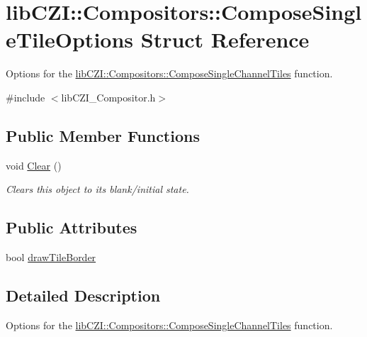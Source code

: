 \hypertarget{structlib_c_z_i_1_1_compositors_1_1_compose_single_tile_options}{}\section{lib\+C\+ZI\+:\+:Compositors\+:\+:Compose\+Single\+Tile\+Options Struct Reference}
\label{structlib_c_z_i_1_1_compositors_1_1_compose_single_tile_options}


Options for the \hyperlink{classlib_c_z_i_1_1_compositors_a8b39ab77c8b83a5a5a8a7e1773e8ad7a}{lib\+C\+Z\+I\+::\+Compositors\+::\+Compose\+Single\+Channel\+Tiles} function.  




{\ttfamily \#include $<$lib\+C\+Z\+I\+\_\+\+Compositor.\+h$>$}

\subsection*{Public Member Functions}
\begin{DoxyCompactItemize}
\item 
\mbox{\label{structlib_c_z_i_1_1_compositors_1_1_compose_single_tile_options_aca165a8ee4157c579b0ac9e7d4f83dc7}} 
void \hyperlink{structlib_c_z_i_1_1_compositors_1_1_compose_single_tile_options_aca165a8ee4157c579b0ac9e7d4f83dc7}{Clear} ()
\begin{DoxyCompactList}\small\item\em Clears this object to its blank/initial state. \end{DoxyCompactList}\end{DoxyCompactItemize}
\subsection*{Public Attributes}
\begin{DoxyCompactItemize}
\item 
bool \hyperlink{structlib_c_z_i_1_1_compositors_1_1_compose_single_tile_options_a9d4799bf8b8a0a89c50506f3a0af4cb2}{draw\+Tile\+Border}
\end{DoxyCompactItemize}


\subsection{Detailed Description}
Options for the \hyperlink{classlib_c_z_i_1_1_compositors_a8b39ab77c8b83a5a5a8a7e1773e8ad7a}{lib\+C\+Z\+I\+::\+Compositors\+::\+Compose\+Single\+Channel\+Tiles} function. 

